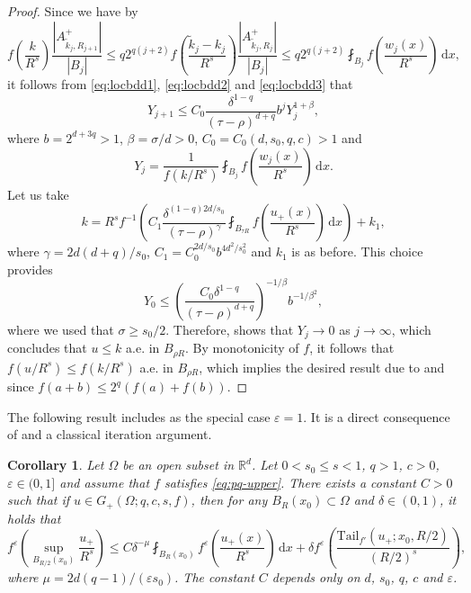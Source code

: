 \documentclass[11pt]{amsart}
\theoremstyle{plain}
\newtheorem{corollary}[theorem]{Corollary}
\theoremstyle{definition}
\numberwithin{equation}{section}
\newcommand{\dx} {\,\mathrm{d}x}
\newcommand{\Rd}{\mathbb{R}^d}
\begin{document}
\begin{proof}
Since we have by 
\begin{equation} \label{eq:locbdd3}
f\left( \frac{k}{R^s} \right) \frac{|A_{\tilde{k}_j, R_{j+1}}^+|}{|B_j|} \leq q 2^{q(j+2)} f\left( \frac{\tilde{k}_j-k_j}{R^s} \right) \frac{|A_{\tilde{k}_j, R_{j}}^+|}{|B_j|} \leq q 2^{q(j+2)} \fint_{B_{j}} f\left(\frac{w_j(x)}{R^s} \right) \dx,
\end{equation}
it follows from \eqref{eq:locbdd1}, \eqref{eq:locbdd2} and \eqref{eq:locbdd3} that
\begin{equation*}
Y_{j+1} \leq C_0 \frac{\delta^{1-q}}{(\tau-\rho)^{d+q}} b^j Y_j^{1+\beta},
\end{equation*}
where $b=2^{d+3q} > 1$, $\beta=\sigma/d > 0$, $C_0=C_0(d, s_0, q, c) > 1$ and
\begin{equation*}
Y_j = \frac{1}{f(k/R^s)} \fint_{B_{j}} f\left( \frac{w_{j}(x)}{R^s} \right) \dx.
\end{equation*}
Let us take
\begin{equation*}
k = R^s f^{-1} \left( C_1 \frac{\delta^{(1-q)2d/s_0}}{(\tau-\rho)^{\gamma}} \fint_{B_{\tau R}} f\left( \frac{u_+(x)}{R^s} \right) \dx \right) + k_1,
\end{equation*}
where $\gamma = 2d(d+q)/s_0$, $C_1 = C_0^{2d/s_0} b^{4d^2/s_0^2}$ and $k_1$ is as before. This choice provides
\begin{equation*}
Y_0 \leq \left( \frac{C_0 \delta^{1-q}}{(\tau-\rho)^{d+q}} \right)^{-1/\beta} b^{-1/\beta^2},
\end{equation*}
where we used that $\sigma \ge s_0 /2$. Therefore, \cite[Lemma 4.7]{LaUr68} shows that $Y_j \to 0$ as $j \to \infty$, which concludes that $u \leq k$ a.e. in $B_{\rho R}$. By monotonicity of $f$, it follows that $f(u/R^s) \leq f(k/R^s)$ a.e. in $B_{\rho R}$, which implies the desired result due to  and since $f(a+b) \le 2^{q}(f(a) + f(b))$.
\end{proof}

The following result includes  as the special case $\varepsilon = 1$. It is a direct consequence of  and a classical iteration argument.

\begin{corollary} \label{cor:locbdd-e}
Let $\Omega$ be an open subset in $\Rd$. Let $0 < s_0 \leq s < 1$, $q > 1$, $c > 0$, $\varepsilon \in (0,1]$ and assume that $f$ satisfies \eqref{eq:pq-upper}. There exists a constant $C > 0$ such that if $u \in G_+(\Omega; q, c, s, f)$, then for any $B_R(x_0) \subset \Omega$ and $\delta \in (0,1)$, it holds that
\begin{equation} \label{eq:locbdd-e}
f^{\varepsilon} \left( \sup_{B_{R/2}(x_0)} \frac{u_+}{R^s} \right) \leq C \delta^{-\mu} \fint_{B_{R}(x_0)} f^{\varepsilon} \left( \frac{u_+(x)}{R^s} \right) \dx + \delta f^{\varepsilon} \left( \frac{\mathrm{Tail}_{f'}(u_+; x_0, R/2)}{(R/2)^s} \right),
\end{equation}
where $\mu = 2d(q-1)/(\varepsilon s_0)$. The constant $C$ depends only on $d$, $s_0$, $q$, $c$ and $\varepsilon$.
\end{corollary}
\end{document}
